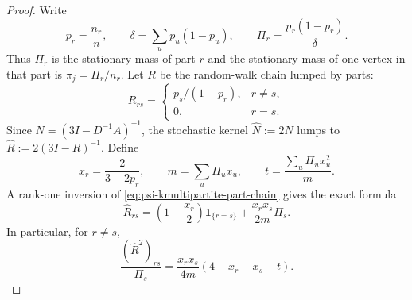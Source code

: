 \documentclass[11pt]{article}
\begin{document}
\begin{proof}
Write
\begin{equation}
 p_r=\frac{n_r}{n},\qquad
 \delta=\sum_u p_u(1-p_u),\qquad
 \Pi_r=\frac{p_r(1-p_r)}{\delta}.
 \label{eq:psi-kmultipartite-masses}
\end{equation}
Thus $\Pi_r$ is the stationary mass of part $r$ and the stationary mass of
one vertex in that part is $\pi_j=\Pi_r/n_r$.  Let
$R$ be the random-walk chain lumped by parts:
\begin{equation}
 R_{rs}=\begin{cases}
 p_s/(1-p_r),&r\neq s,\\
 0,&r=s.
 \end{cases}
 \label{eq:psi-kmultipartite-part-chain}
\end{equation}
Since $N=(3I-D^{-1}A)^{-1}$, the stochastic kernel
$\widehat N:=2N$ lumps to
$\widehat R:=2(3I-R)^{-1}$.  Define
\begin{equation}
 x_r=\frac{2}{3-2p_r},\qquad
 m=\sum_u\Pi_u x_u,\qquad
 t=\frac{\sum_u\Pi_u x_u^2}{m}.
 \label{eq:psi-kmultipartite-xmt}
\end{equation}
A rank-one inversion of \cref{eq:psi-kmultipartite-part-chain} gives the
exact formula
\begin{equation}
 \widehat R_{rs}
 =\left(1-\frac{x_r}{2}\right)\mathbf1_{\{r=s\}}
   +\frac{x_rx_s}{2m}\Pi_s.
 \label{eq:psi-kmultipartite-rhat}
\end{equation}
In particular, for $r\neq s$,
\begin{equation}
 \frac{(\widehat R^2)_{rs}}{\Pi_s}
 =\frac{x_rx_s}{4m}(4-x_r-x_s+t).
 \label{eq:psi-kmultipartite-cross-ratio}
\end{equation}


\end{proof}
\end{document}
